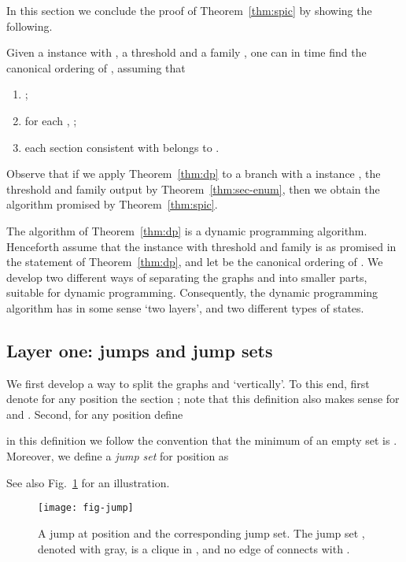 \providecommand{\jump}[1]{\mathtt{jump}(#1)}
\providecommand{\jumpset}[1]{X_{#1}}
\providecommand{\secp}[1]{A_{#1}}
\providecommand{\jumpfam}{\mathcal{J}}
\providecommand{\chainfam}{\mathcal{C}}

In this section we conclude the proof of Theorem~\ref{thm:spic}
by showing the following.
\begin{theorem}\label{thm:dp}
Given a \spic{} instance  with ,
 a threshold  and a family ,
one can in  time find the canonical ordering  of , assuming that
\begin{enumerate}
\item ;
\item for each , ;
\item each section consistent with  belongs to .
\end{enumerate}
\end{theorem}
Observe that if we apply Theorem~\ref{thm:dp} to a branch with a \spic{} instance ,
the threshold  and family  output by Theorem~\ref{thm:sec-enum},
then we obtain the algorithm promised by Theorem~\ref{thm:spic}.

The algorithm of Theorem~\ref{thm:dp} is a dynamic programming algorithm.
Henceforth assume that the instance  with threshold  and family 
is as promised in the statement of Theorem~\ref{thm:dp}, and let  be the canonical ordering of .
We develop two different ways of separating the graphs  and  into smaller parts,
suitable for dynamic programming. Consequently, the dynamic programming algorithm
has in some sense `two layers', and two different types of states.

\subsection{Layer one: jumps and jump sets}

We first develop a way to split the graphs  and  `vertically'.
To this end, first denote for any position 
the section ; note that this definition also makes sense
for  and .
Second, for any position  define

in this definition we follow the convention that the minimum of an empty set is . Moreover, we define a \emph{jump set} for position  as

See also Fig.~\ref{fig:jump} for an illustration.

\begin{figure}
\centering
\texttt{[image: fig-jump]}
\caption{A jump at position  and the corresponding jump set.
  The jump set , denoted with gray, is a clique in , and no edge of 
    connects  with .}
\label{fig:jump}
\end{figure}

